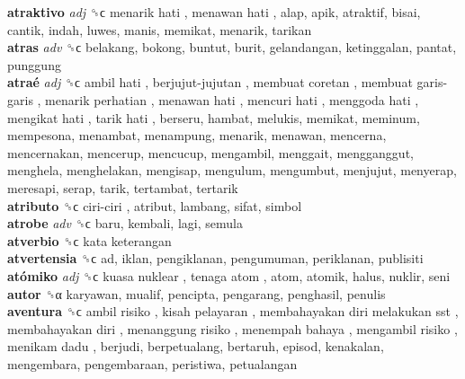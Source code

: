 \textbf{atraktivo} \emph{adj}  ␝ϲ   menarik hati ,  menawan hati , alap, apik, atraktif, bisai, cantik, indah, luwes, manis, memikat, menarik, tarikan  \\
\textbf{atras} \emph{adv}  ␝ϲ  belakang, bokong, buntut, burit, gelandangan, ketinggalan, pantat, punggung  \\
\textbf{atraé} \emph{adj}  ␝ϲ   ambil hati ,  berjujut-jujutan ,  membuat coretan ,  membuat garis-garis ,  menarik perhatian ,  menawan hati ,  mencuri hati ,  menggoda hati ,  mengikat hati ,  tarik hati , berseru, hambat, melukis, memikat, meminum, mempesona, menambat, menampung, menarik, menawan, mencerna, mencernakan, mencerup, mencucup, mengambil, menggait, mengganggut, menghela, menghelakan, mengisap, mengulum, mengumbut, menjujut, menyerap, meresapi, serap, tarik, tertambat, tertarik  \\
\textbf{atributo} ␝ϲ   ciri-ciri , atribut, lambang, sifat, simbol  \\
\textbf{atrobe} \emph{adv}  ␝ϲ  baru, kembali, lagi, semula  \\
\textbf{atverbio} ␝ϲ   kata keterangan   \\
\textbf{atvertensia} ␝ϲ  ad, iklan, pengiklanan, pengumuman, periklanan, publisiti  \\
\textbf{atómiko} \emph{adj}  ␝ϲ   kuasa nuklear ,  tenaga atom , atom, atomik, halus, nuklir, seni  \\
\textbf{autor} ␝α  karyawan, mualif, pencipta, pengarang, penghasil, penulis  \\
\textbf{aventura} ␝ϲ   ambil risiko ,  kisah pelayaran ,  membahayakan diri melakukan sst ,  membahayakan diri ,  menanggung risiko ,  menempah bahaya ,  mengambil risiko ,  menikam dadu , berjudi, berpetualang, bertaruh, episod, kenakalan, mengembara, pengembaraan, peristiwa, petualangan  \\
